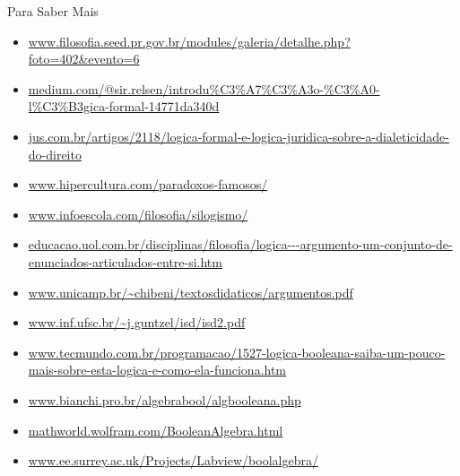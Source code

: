 	
\begin{frame}{Para Saber Mais}
	
		\tiny
		\begin{itemize}
			\item \url{www.filosofia.seed.pr.gov.br/modules/galeria/detalhe.php?foto=402&evento=6}
			\item \url{medium.com/@sir.relsen/introdu\%C3\%A7\%C3\%A3o-\%C3\%A0-l\%C3\%B3gica-formal-14771da340d}
			\item \url{jus.com.br/artigos/2118/logica-formal-e-logica-juridica-sobre-a-dialeticidade-do-direito}
			\item \url{www.hipercultura.com/paradoxos-famosos/}
			\item \url{www.infoescola.com/filosofia/silogismo/}
			\item \url{educacao.uol.com.br/disciplinas/filosofia/logica---argumento-um-conjunto-de-enunciados-articulados-entre-si.htm}
			\item \url{www.unicamp.br/~chibeni/textosdidaticos/argumentos.pdf}
			\item \url{www.inf.ufsc.br/~j.guntzel/isd/isd2.pdf}
			\item \url{www.tecmundo.com.br/programacao/1527-logica-booleana-saiba-um-pouco-mais-sobre-esta-logica-e-como-ela-funciona.htm}
			\item \url{www.bianchi.pro.br/algebrabool/algbooleana.php}
			\item \url{mathworld.wolfram.com/BooleanAlgebra.html}
			\item \url{www.ee.surrey.ac.uk/Projects/Labview/boolalgebra/}
		\end{itemize}
	
\end{frame}




